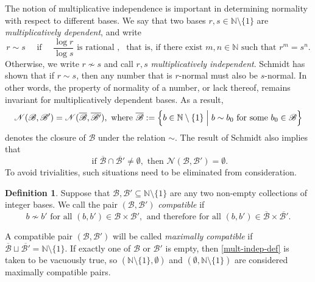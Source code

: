 \documentclass[12pt, twoside]{article}
\theoremstyle{definition}
\newtheorem{definition}[theorem]{Definition}
\numberwithin{equation}{section}
\begin{document}
\vskip0.1in 
\noindent The notion of multiplicative independence is important in determining normality with respect to different bases. We say that two bases $r, s \in \mathbb N \setminus \{1\}$ are {\em{multiplicatively dependent}}, and write 
\begin{equation} \label{def-mult-dep} r \sim s \quad \text{ if } \quad \frac{\log r}{\log s} \text{ is rational }, \; \text{ that is, if there exist $m, n \in \mathbb N$ such that } r^m = s^n.  \end{equation}    
Otherwise, we write $r \not\sim s$ and call $r, s$ {\em{multiplicatively independent}}. Schmidt \cite[Theorem 1]{s60} has shown that if $r \sim s$, then any number that is $r$-normal must also be $s$-normal. In other words, the property of normality of a number, or lack thereof, remains invariant for multiplicatively dependent bases. As a result,  
\begin{equation} \label{N4} 
\mathscr N(\mathscr{B}, \mathscr{B}') = \mathscr N(\overline{\mathscr{B}}, \overline{\mathscr{B}'}), \text{ where } 
\overline{\mathscr{B}} := \left\{b \in \mathbb N \setminus \{1\} \; \Bigl| \; b \sim b_0 \text{ for some } b_0 \in \mathscr{B} \right\}
\end{equation}
denotes the closure of $\mathscr{B}$ under the relation $\sim$. The result of Schmidt also implies that 
\begin{equation} 
\text{ if } \overline{\mathscr{B}} \cap \overline{\mathscr{B'}} \neq \emptyset,
 \text{ then } 
 \mathscr{N}(\mathscr{B}, \mathscr{B}') = \emptyset. 
 \label{empty-normal} \end{equation} 
To avoid trivialities, such situations need to be eliminated from consideration. 
\vskip0.12in 
\begin{definition} \label{compatibility-definition}
Suppose that $\mathscr{B}, \mathscr{B}' \subseteq \mathbb N \setminus \{1\}$ are any two non-empty collections of integer bases. We call the pair $(\mathscr{B}, \mathscr{B}')$ {\em{compatible}} if 
\begin{equation} b \not\sim b' \text{ for all $(b,b') \in \mathscr{B} \times \mathscr{B}'$,} \; \; \text{and therefore for all $(b, b') \in \overline{\mathscr{B}} \times \overline{\mathscr{B}'}$.} \label{mult-indep-def} \end{equation}
\end{definition} 
\noindent A compatible pair $(\mathscr{B}, \mathscr{B}')$ will be called {\em{maximally compatible}} if $\overline{\mathscr{B}} \sqcup \overline{\mathscr{B}'} = \mathbb N \setminus \{1\}$. If exactly one of $\mathscr{B}$ or $\mathscr{B}'$ is empty, then \eqref{mult-indep-def} is taken to be vacuously true, so  $(\mathbb N \setminus \{1\}, \emptyset)$ and $(\emptyset, \mathbb N \setminus \{1\})$ are considered maximally compatible pairs. 
\end{document}
